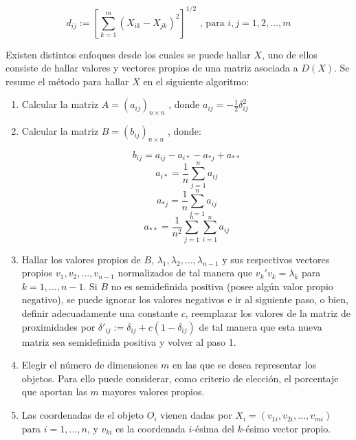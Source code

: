 \documentclass[12pt,oneside]{book}\usepackage[]{graphicx}\usepackage[]{color}
\theoremstyle{definition} %
\begin{document}
$$ d_{ij}:=\left[\displaystyle \sum_{k=1}^m (X_{ik}-X_{jk})^2 \right]^{1/2} \text{ , para } i,j=1,2,...,m$$


Existen distintos enfoques desde los cuales se puede hallar $X$, uno de ellos consiste de hallar valores y vectores propios de una matriz asociada a $D(X)$. Se resume el método para hallar $X$ en el siguiente algoritmo:

\begin{enumerate}

\item Calcular la matriz $A=(a_{ij})_{n\times n}$ , donde $a_{ij} = -\frac{1}{2}\delta_{ij}^2$
\item Calcular la matriz $B = (b_{ij})_{n\times n}$ , donde: 

$$b_{ij} = a_{ij} -a_{i*}-a_{*j} + a_{**} $$
$$a_{i*} = \frac{1}{n} \sum_{j=1}^n a_{ij}  $$
$$a_{*j} = \frac{1}{n} \sum_{i=1}^n a_{ij}  $$
$$a_{**} = \frac{1}{n^2} \sum_{j=1}^n  \sum_{i=1}^n  a_{ij}  $$

\item Hallar los valores propios de $B$, $\lambda_1, \lambda_2, \dots , \lambda_{n-1}$ y sus respectivos vectores propios $v_1, v_2, \dots, v_{n-1}$ normalizados de tal manera que $v_k' v_k = \lambda_k$ para $k=1,\dots,n-1$. Si $B$ no es semidefinida positiva (posee algún valor propio negativo), se puede ignorar los valores negativos e ir al siguiente paso, o bien, definir adecuadamente una constante $c$, reemplazar los valores de la matriz de proximidades por $\delta'_{ij} := \delta_{ij} + c(1-\delta_{ij}) $ de tal manera que esta nueva matriz sea semidefinida positiva y volver al paso 1.

\item Elegir el número de dimensiones $m$ en las que se desea representar los objetos. Para ello puede considerar, como criterio de elección, el porcentaje que aportan las $m$ mayores valores propios.

\item Las coordenadas de el objeto $O_i$ vienen dadas por $X_i = (v_{1i}, v_{2i},\dots, v_{mi})$ para $i=1,\dots,n$, y $v_{ki}$ es la coordenada $i$-ésima del $k$-ésimo vector propio.

\end{enumerate}
\end{document}
